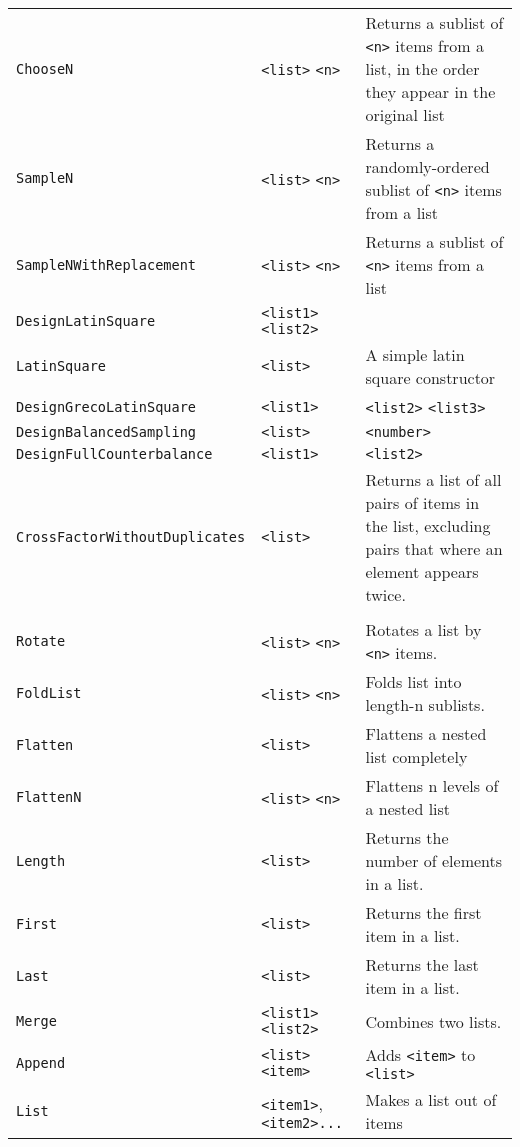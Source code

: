 \begin{longtable}{p{3cm}p{3cm}p{6cm}}
\verb+ChooseN+ & \verb+<list>+ \verb+<n>+ & Returns a sublist of \verb+<n>+ items from a 
list, in the order they appear in the original list\\ 
\verb+SampleN+ & \verb+<list>+ \verb+<n>+ & Returns a randomly-ordered sublist of \verb+<n>+ items from a list\\ 
\verb+SampleNWithReplacement+ &\hspace{1.5cm} \verb+<list>+ \verb+<n>+& Returns a sublist of \verb+<n>+ items from a list \\ 
\verb+DesignLatinSquare+ &\verb+<list1>+ \verb+<list2>+ & \\ 
\verb+LatinSquare+ &\verb+<list>+& A simple latin square constructor\\ 
\verb+DesignGrecoLatinSquare+ &\hspace{1.5cm}\verb+<list1>+ &\verb+<list2>+ \verb+<list3>+ \\ 
\verb+DesignBalancedSampling+ &\hspace{1.5cm}\verb+<list>+ & \verb+<number>+ \\ 
\verb+DesignFullCounterbalance+ &\hspace{1.5cm}\verb+<list1>+ &\verb+<list2>+ \\ 
\verb+CrossFactorWithoutDuplicates+ &\hspace{1.8cm}\verb+<list>+ & Returns a list of all pairs of items in the list, excluding pairs that where an element appears twice. \\ 
& & \\ 
\verb+Rotate+ &\verb+<list>+ \verb+<n>+ & Rotates a list by \verb+<n>+ items.\\ 
\verb+FoldList+ &\verb+<list>+ \verb+<n>+ & Folds list into length-n sublists.\\ 
\verb+Flatten+ &\verb+<list>+ & Flattens a nested list completely\\ 
\verb+FlattenN+ &\verb+<list>+ \verb+<n>+ & Flattens n levels of a nested list\\ 
\verb+Length+ &\verb+<list>+ & Returns the number of elements in a list.\\ 
\verb+First+ &\verb+<list>+ & Returns the first item in a list. \\ 
\verb+Last+ &\verb+<list>+ & Returns the last item in a list.\\ 
\verb+Merge+ &\verb+<list1>+ \verb+<list2>+& Combines two lists.\\ 
\verb+Append+ &\verb+<list>+ \verb+<item>+ & Adds \verb+<item>+ to \verb+<list>+ \\ 
\verb+List+ &\verb+<item1>+, \verb+<item2>...+ &Makes a list out of items\\ 

\end{longtable}

